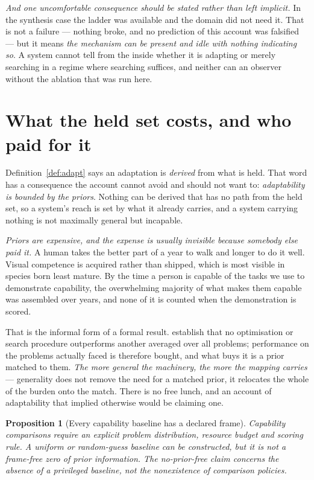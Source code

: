 \documentclass[11pt,a4paper]{article}
\newtheorem{proposition}[definition]{Proposition}
\theoremstyle{remark}
\begin{document}
\emph{And one uncomfortable consequence should be stated rather than left implicit.} In the synthesis
case the ladder was available and the domain did not need it. That is not a failure --- nothing broke,
and no prediction of this account was falsified --- but it means \emph{the mechanism can be present and
idle with nothing indicating so}. A system cannot tell from the inside whether it is adapting or merely
searching in a regime where searching suffices, and neither can an observer without the ablation that
was run here.

\section{What the held set costs, and who paid for it}\label{sec:priors}
Definition~\ref{def:adapt} says an adaptation is \emph{derived} from what is held. That word has a
consequence the account cannot avoid and should not want to: \emph{adaptability is bounded by the
priors}. Nothing can be derived that has no path from the held set, so a system's reach is set by what
it already carries, and a system carrying nothing is not maximally general but incapable.

\emph{Priors are expensive, and the expense is usually invisible because somebody else paid it.} A
human takes the better part of a year to walk and longer to do it well. Visual competence is acquired
rather than shipped, which is most visible in species born least mature. By the time a person is
capable of the tasks we use to demonstrate capability, the overwhelming majority of what makes them
capable was assembled over years, and none of it is counted when the demonstration is scored.

That is the informal form of a formal result. \citet{wolpert1997} establish that no optimisation or search
procedure outperforms another averaged over all problems; performance on the problems actually faced is
therefore bought, and what buys it is a prior matched to them. \emph{The more general the machinery,
the more the mapping carries} --- generality does not remove the need for a matched prior, it relocates
the whole of the burden onto the match. There is no free lunch, and an account of adaptability that
implied otherwise would be claiming one.

\begin{proposition}[Every capability baseline has a declared frame]\label{prop:no-prior-free}
Capability comparisons require an explicit problem distribution, resource
budget and scoring rule. A uniform or random-guess baseline can be
constructed, but it is not a frame-free zero of prior information. The
no-prior-free claim concerns the absence of a privileged baseline, not
the nonexistence of comparison policies.
\end{proposition}
\end{document}
